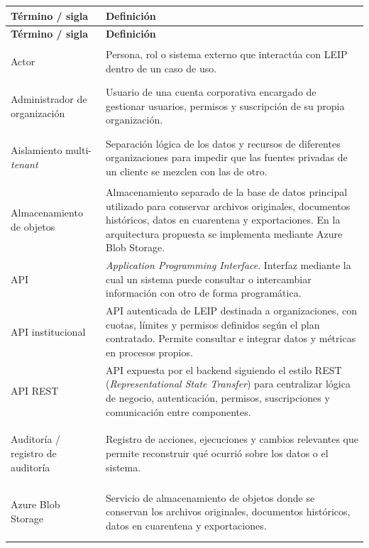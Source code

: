 \documentclass[11pt,a4paper]{article}
\makeatletter
\newcommand{\proyectoNombre}{LEIP}
\newenvironment{glosario}{%
  \renewcommand{\arraystretch}{1.18}%
  \begin{longtable}{@{}>{\raggedright\arraybackslash\bfseries}p{4.0cm} >{\raggedright\arraybackslash}p{10.7cm}@{}}
  \toprule
  \textbf{T\'ermino / sigla} & \textbf{Definici\'on} \\
  \midrule
  \endfirsthead
  \toprule
  \textbf{T\'ermino / sigla} & \textbf{Definici\'on} \\
  \midrule
  \endhead
  \bottomrule
  \endfoot
}{%
  \end{longtable}
  \renewcommand{\arraystretch}{1}%
}
\makeatother
\begin{document}
\begin{glosario}

Actor & Persona, rol o sistema externo que interact\'ua con \proyectoNombre{} dentro de un caso de uso. \\
\addlinespace

Administrador de organizaci\'on & Usuario de una cuenta corporativa encargado de gestionar usuarios, permisos y suscripci\'on de su propia organizaci\'on. \\
\addlinespace

Aislamiento multi-\emph{tenant} & Separaci\'on l\'ogica de los datos y recursos de diferentes organizaciones para impedir que las fuentes privadas de un cliente se mezclen con las de otro. \\
\addlinespace

Almacenamiento de objetos & Almacenamiento separado de la base de datos principal utilizado para conservar archivos originales, documentos hist\'oricos, datos en cuarentena y exportaciones. En la arquitectura propuesta se implementa mediante Azure Blob Storage. \\
\addlinespace

API & \emph{Application Programming Interface}. Interfaz mediante la cual un sistema puede consultar o intercambiar informaci\'on con otro de forma program\'atica. \\
\addlinespace

API institucional & API autenticada de \proyectoNombre{} destinada a organizaciones, con cuotas, l\'imites y permisos definidos seg\'un el plan contratado. Permite consultar e integrar datos y m\'etricas en procesos propios. \\
\addlinespace

API REST & API expuesta por el backend siguiendo el estilo REST (\emph{Representational State Transfer}) para centralizar l\'ogica de negocio, autenticaci\'on, permisos, suscripciones y comunicaci\'on entre componentes. \\
\addlinespace

Auditor\'ia / registro de auditor\'ia & Registro de acciones, ejecuciones y cambios relevantes que permite reconstruir qu\'e ocurri\'o sobre los datos o el sistema. \\
\addlinespace

Azure Blob Storage & Servicio de almacenamiento de objetos donde se conservan los archivos originales, documentos hist\'oricos, datos en cuarentena y exportaciones. \\
\addlinespace


\end{glosario}
\end{document}
